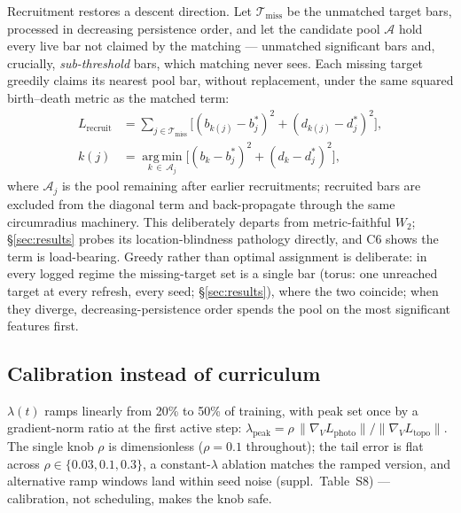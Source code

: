 Recruitment restores a descent direction. Let $\mathcal{T}_{\mathrm{miss}}$ be the unmatched target
bars, processed in decreasing persistence order, and let the candidate pool
$\mathcal{A}$ hold every live bar not claimed by the matching --- unmatched
significant bars and, crucially, \emph{sub-threshold} bars, which matching
never sees. Each missing target greedily claims its nearest pool bar,
without replacement, under the same squared birth--death metric as the
matched term:
\begin{equation}
\begin{split}
L_{\mathrm{recruit}} &= \!\!\sum_{j\in\mathcal{T}_{\mathrm{miss}}}\!\!
  \big[(b_{k(j)}-b^*_j)^2+(d_{k(j)}-d^*_j)^2\big],\\
k(j) &= \operatorname*{arg\,min}_{k\,\in\,\mathcal{A}_j}
  \big[(b_k-b^*_j)^2+(d_k-d^*_j)^2\big],
\end{split}
\end{equation}
where $\mathcal{A}_j$ is the pool remaining after earlier recruitments;
recruited bars are excluded from the diagonal term and back-propagate
through the same circumradius machinery.
This deliberately departs from metric-faithful $W_2$;
\S\ref{sec:results} probes its location-blindness pathology directly,
and C6 shows the term is load-bearing.
Greedy rather than optimal assignment is deliberate: in every logged
regime the missing-target set is a single bar (torus: one unreached
target at every refresh, every seed; \S\ref{sec:results}), where the two
coincide; when they diverge, decreasing-persistence order spends the
pool on the most significant features first.

\subsection{Calibration instead of curriculum}
$\lambda(t)$ ramps linearly from 20\% to 50\% of training, with peak set once
by a gradient-norm ratio at the first active step:
$\lambda_{\mathrm{peak}}=\rho\,\lVert\nabla_V L_{\mathrm{photo}}\rVert /
\lVert\nabla_V L_{\mathrm{topo}}\rVert$. The single knob $\rho$ is
dimensionless ($\rho{=}0.1$ throughout); the tail error is flat across
$\rho\in\{0.03,0.1,0.3\}$, a constant-$\lambda$ ablation matches the
ramped version, and alternative ramp windows land within seed noise
(suppl.\ Table~S8) --- calibration, not scheduling, makes the knob safe.

